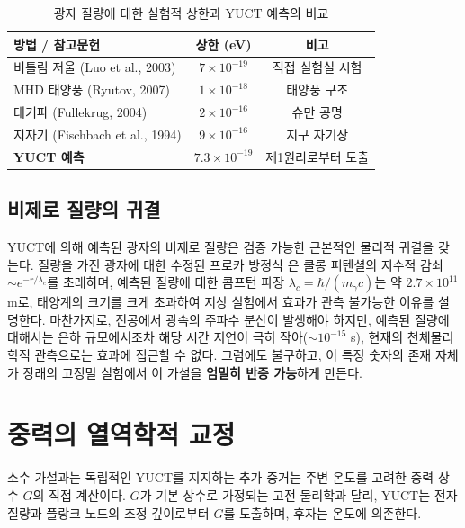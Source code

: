 \documentclass[11pt,a4paper]{article}
\begin{document}
	\begin{table}[h!]
		\centering
		\caption{광자 질량에 대한 실험적 상한과 YUCT 예측의 비교}
		\label{tab:photon_limits}
		\small
		\begin{tabular}{lcc}
			\toprule
			\textbf{방법 / 참고문헌} & \textbf{상한 (eV)} & \textbf{비고} \\
			\midrule
			비틀림 저울 (Luo et al., 2003) & $7\times10^{-19}$ & 직접 실험실 시험 \\
			MHD 태양풍 (Ryutov, 2007) & $1\times10^{-18}$ & 태양풍 구조 \\
			대기파 (Fullekrug, 2004) & $2\times10^{-16}$ & 슈만 공명 \\
			지자기 (Fischbach et al., 1994) & $9\times10^{-16}$ & 지구 자기장 \\
			\midrule
			\textbf{YUCT 예측} & \textbf{$7.3\times10^{-19}$} & 제1원리로부터 도출 \\
			\bottomrule
		\end{tabular}
	\end{table}
	
	\subsection{비제로 질량의 귀결}
	YUCT에 의해 예측된 광자의 비제로 질량은 검증 가능한 근본적인 물리적 귀결을 갖는다. 질량을 가진 광자에 대한 수정된 프로카 방정식 \cite{Proca1936}은 쿨롱 퍼텐셜의 지수적 감쇠 $\sim e^{-r/\lambda_c}$를 초래하며, 예측된 질량에 대한 콤프턴 파장 $\lambda_c = \hbar / (m_\gamma c)$는 약 $2.7 \times 10^{11}$ m로, 태양계의 크기를 크게 초과하여 지상 실험에서 효과가 관측 불가능한 이유를 설명한다. 마찬가지로, 진공에서 광속의 주파수 분산이 발생해야 하지만, 예측된 질량에 대해서는 은하 규모에서조차 해당 시간 지연이 극히 작아($\sim 10^{-15}$ s), 현재의 천체물리학적 관측으로는 효과에 접근할 수 없다. 그럼에도 불구하고, 이 특정 숫자의 존재 자체가 장래의 고정밀 실험에서 이 가설을 \textbf{엄밀히 반증 가능}하게 만든다.
	
	\section{중력의 열역학적 교정}
	\label{sec:thermal_gravity}
	
	소수 가설과는 독립적인 YUCT를 지지하는 추가 증거는 주변 온도를 고려한 중력 상수 $G$의 직접 계산이다. $G$가 기본 상수로 가정되는 고전 물리학과 달리, YUCT는 전자 질량과 플랑크 노드의 조정 깊이로부터 $G$를 도출하며, 후자는 온도에 의존한다.
	
\end{document}
